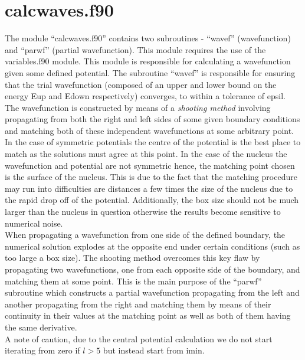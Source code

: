 \documentclass[11pt]{report}
\begin{document}
\section{calcwaves.f90}
The module ``calcwaves.f90'' contains two subroutines - ``wavef'' (wavefunction) and ``parwf'' (partial wavefunction). This module requires the use of the variables.f90 module. This module is responsible for calculating a wavefunction given some defined potential. The subroutine ``wavef'' is responsible for ensuring that the trial wavefunction (composed of an upper and lower bound on the energy Eup and Edown respectively) converges, to within a tolerance of epsil. The wavefunction is constructed by means of a \textit{shooting method} involving propagating from both the right and left sides of some given boundary conditions and matching both of these independent wavefunctions at some arbitrary point. In the case of symmetric potentials the centre of the potential is the best place to match as the solutions must agree at this point. In the case of the nucleus the wavefunction and potential are not symmetric hence, the matching point chosen is the surface of the nucleus. This is due to the fact that the matching procedure may run into difficulties are distances a few times the size of the nucleus due to the rapid drop off of the potential. Additionally, the box size should not be much larger than the nucleus in question otherwise the results become sensitive to numerical noise.  \\
When propagating a wavefunction from one side of the defined boundary, the numerical solution explodes at the opposite end under certain conditions (such as too large a box size). The shooting method overcomes this key flaw by propagating two wavefunctions, one from each opposite side of the boundary, and matching them at some point. This is the main purpose of the ``parwf'' subroutine which constructs a partial wavefunction propagating from the left and another propagating from the right and matching them by means of their continuity in their values at the matching point as well as both of them having the same derivative. \\
A note of caution, due to the central potential calculation we do not start iterating from zero if $l>5$ but instead start from imin.  
\end{document}

